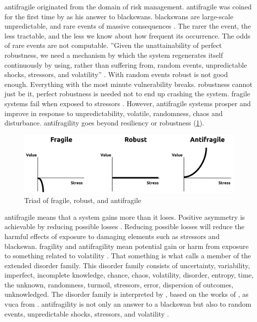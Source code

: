 \Gls{antifragile} originated from the domain of risk management. \Gls{antifragile} was coined for the first time by \textcite{Taleb2012} as his answer to \glspl{blackswan}. \Glspl{blackswan} are large-scale unpredictable, and rare events of massive consequences \parencite[pp.~6--7]{Taleb2012}. The rarer the event, the less tractable, and the less we know about how frequent its occurrence. The odds of rare events are not computable. ''Given the unattainability of perfect robustness, we need a mechanism by which the system regenerates itself continuously by using, rather than suffering from, random events, unpredictable shocks, \glspl{stressor}, and \gls{volatility}'' \parencite[p.~8]{Taleb2012}. With random events \gls{robust} is not good enough. Everything with the most minute vulnerability breaks. \Gls{robustness} cannot just be it, perfect \gls{robustness} is needed not to end up crashing the system. \Gls{fragile} systems fail when exposed to \glspl{stressor} \parencite[p.~21]{Ghasemi2017}. However, \gls{antifragile} systems prosper and improve in response to unpredictability, \gls{volatile}, randomness, chaos and disturbance. \Gls{antifragility} goes beyond \gls{resiliency} or \gls{robustness} (\cref{fig:eaal-triad}).
\begin{figure}[H]
	\centering
	\includegraphics[width=0.8\linewidth]{images/eaal-triad}
	\caption[Triad of fragile, robust, and antifragile \parencite{Botjes2021}]{Triad of fragile, robust, and antifragile \parencite{Botjes2021}}
	\label{fig:eaal-triad}
\end{figure}
\Gls{antifragile} means that a system gains more than it loses. Positive asymmetry is achievable by reducing possible losses \parencite[p.~942]{Russo2017}. Reducing possible losses will reduce the harmful effects of exposure to damaging elements such as \glspl{stressor} and \gls{blackswan}. \Gls{fragility} and \gls{antifragility} mean potential gain or harm from exposure to something related to \gls{volatility} \parencite[p.~13]{Taleb2012}. That something is what \textcite[p.~13]{Taleb2012} calls a member of the extended disorder family. This disorder family consists of \gls{uncertainty}, variability, imperfect, incomplete knowledge, chance, chaos, \gls{volatility}, disorder, \gls{entropy}, time, the unknown, randomness, turmoil, \glspl{stressor}, error, dispersion of outcomes, unknowledged. The disorder family is interpreted by \textcite[p.~12]{Botjes2020}, based on the works of \textcites[p.~436]{Taleb2012}[p.~3]{Gorgeon2015}, as \acrlong{vuca} from \textcite{Bennis1985}. \Gls{antifragility} is not only an answer to a \gls{blackswan} but also to random events, unpredictable shocks, \glspl{stressor}, and \gls{volatility} \parencite[p.~8]{Taleb2012}.
